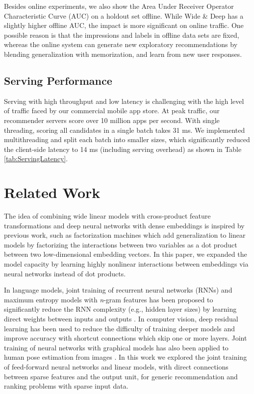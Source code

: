 \documentclass{sig-alternate-05-2015}
\begin{document}
Besides online experiments, we also show the Area Under Receiver Operator Characteristic Curve (AUC) on a holdout set offline. While Wide \& Deep has a slightly higher offline AUC, the impact is more significant on online traffic. One possible reason is that the impressions and labels in offline data sets are fixed, whereas the online system can generate new exploratory recommendations by blending generalization with memorization, and learn from new user responses.

\subsection{Serving Performance}
Serving with high throughput and low latency is challenging with the high level of traffic faced by our commercial mobile app store. At peak traffic, our recommender servers score over 10 million apps per second. With single threading, scoring all candidates in a single batch takes 31 ms. We implemented multithreading and split each batch into smaller sizes, which significantly reduced the client-side latency to 14 ms (including serving overhead) as shown in Table \ref{tab:ServingLatency}.

\section{Related Work}
The idea of combining wide linear models with cross-product feature transformations and deep neural networks with dense embeddings is inspired by previous work, such as factorization machines \cite{LibFMTIST12} which add generalization to linear models by factorizing the interactions between two variables as a dot product between two low-dimensional embedding vectors. In this paper, we expanded the model capacity by learning highly nonlinear interactions between embeddings via neural networks instead of dot products.

In language models, joint training of recurrent neural networks (RNNs) and maximum entropy models with \textit{n}-gram features has been proposed to significantly reduce the RNN complexity (e.g., hidden layer sizes) by learning direct weights between inputs and outputs \cite{MaxentRNN11}.
In computer vision, deep residual learning \cite{DeepResidualLearning} has been used to reduce the difficulty of training deeper models and improve accuracy with shortcut connections which skip one or more layers.
Joint training of neural networks with graphical models has also been applied to human pose estimation from images \cite{JointCNNMRF14}. In this work we explored the joint training of feed-forward neural networks and linear models, with direct connections between sparse features and the output unit, for generic recommendation and ranking problems with sparse input data.
\end{document}
